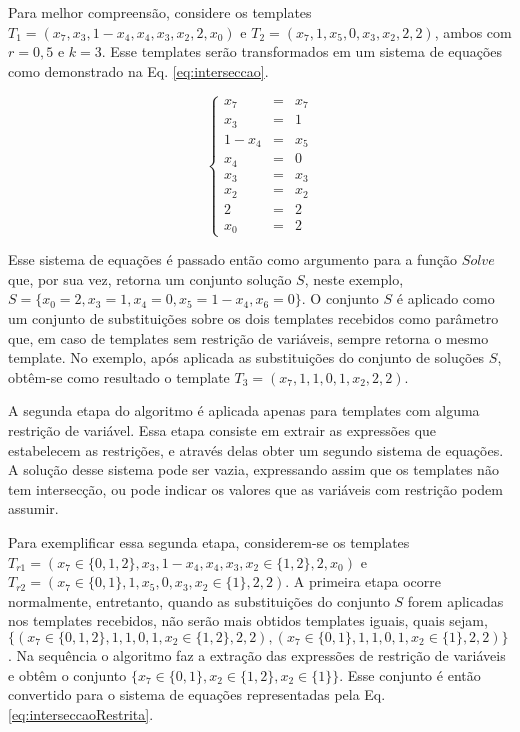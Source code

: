 Para melhor compreensão, considere os templates $T_1 = (x_7,x_3,1-x_4,x_4,x_3,x_2,2,x_0)$ e $T_2 = (x_7,1,x_5,0,x_3,x_2,2,2)$, ambos com $r=0{,}5$ e $k=3$. Esse templates serão transformados em um sistema de equações como demonstrado na Eq. \eqref{eq:interseccao}.

\begin{equation}
\left\{\begin{matrix}
x_7   & = & x_7 \\ 
x_3   & = & 1 \\ 
1-x_4 & = & x_5    \\ 
x_4   & = & 0    \\ 
x_3   & = & x_3    \\ 
x_2   & = & x_2   \\ 
2     & = & 2   \\ 
x_0   & = & 2
\end{matrix}\right.
\label{eq:interseccao}
\end{equation}

Esse sistema de equações é passado então como argumento para a função $Solve$ que, por sua vez, retorna um conjunto solução $S$, neste exemplo, $S = \{x_0 = 2, x_3 = 1, x_4 = 0, x_5 = 1 - x_4, x_6 = 0\}$. O conjunto $S$ é aplicado como um conjunto de substituições sobre os dois templates recebidos como parâmetro que, em caso de templates sem restrição de variáveis, sempre retorna o mesmo template. No exemplo, após aplicada as substituições do conjunto de soluções $S$, obtêm-se como resultado o template $T_3 = (x_7, 1, 1, 0, 1, x_2, 2, 2)$.

A segunda etapa do algoritmo é aplicada apenas para templates com alguma restrição de variável. Essa etapa consiste em extrair as expressões que estabelecem as restrições, e através delas obter um segundo sistema de equações. A solução desse sistema pode ser vazia, expressando assim que os templates não tem intersecção, ou pode indicar os valores que as variáveis com restrição podem assumir.

Para exemplificar essa segunda etapa, considerem-se os templates $T_{r1} = (x_7 \in \{0,1,2\},x_3,1-x_4,x_4,x_3,x_2 \in \{1,2\},2,x_0)$ e $T_{r2} = (x_7 \in \{0,1\},1,x_5,0,x_3,x_2 \in \{1\},2,2)$. A primeira etapa ocorre normalmente, entretanto, quando as substituições do conjunto $S$ forem aplicadas nos templates recebidos, não serão mais obtidos templates iguais, quais sejam, $\{(x_7 \in \{0,1,2\}, 1, 1, 0, 1, x_2 \in \{1,2\}, 2, 2), (x_7 \in \{0,1\}, 1, 1, 0, 1, x_2 \in \{1\}, 2, 2)\}$. Na sequência o algoritmo faz a extração das expressões de restrição de variáveis e obtêm o conjunto $\{x_7 \in \{0,1\}, x_2 \in \{1,2\}, x_2 \in \{1\} \}$. Esse conjunto é então convertido para o sistema de equações representadas pela Eq. \eqref{eq:interseccaoRestrita}.

